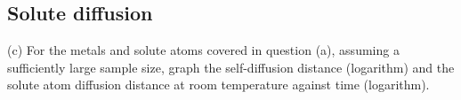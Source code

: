 \subsection{Solute diffusion}



(c) For the metals and solute atoms covered in question (a), assuming a sufficiently large sample size, graph the self-diffusion distance (logarithm) and the solute atom diffusion distance at room temperature against time (logarithm).
